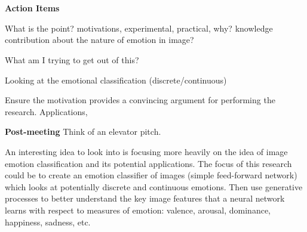 \documentclass[10pt,a4paper]{article}
\begin{document}
	\\\\
	\textbf{Action Items}
	\begin{todolist}
		\item What is the point? motivations, experimental, practical, why? knowledge contribution about the nature of emotion in image?
		\item What am I trying to get out of this? 
		\item Looking at the emotional classification (discrete/continuous)
		\item Ensure the motivation provides a convincing argument for performing the research.
		Applications, 
	\end{todolist}
	\textbf{Post-meeting}
	Think of an elevator pitch.
	
	An interesting idea to look into is focusing more heavily on the idea of image emotion classification and its potential applications.
	The focus of this research could be to create an emotion classifier of images (simple feed-forward network) which looks at potentially discrete and continuous emotions. Then use generative processes to better understand the key image features that a neural network learns with respect to measures of emotion: valence, arousal, dominance, happiness, sadness, etc.
	
	
	
	
	
\end{document}
